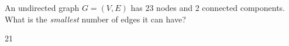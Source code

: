 \begin{prob}
    An undirected graph $G = (V, E)$ has 23 nodes and 2 connected components.
    What is the \emph{smallest} number of edges it can have?

    \begin{soln}
        21
    \end{soln}

\end{prob}
